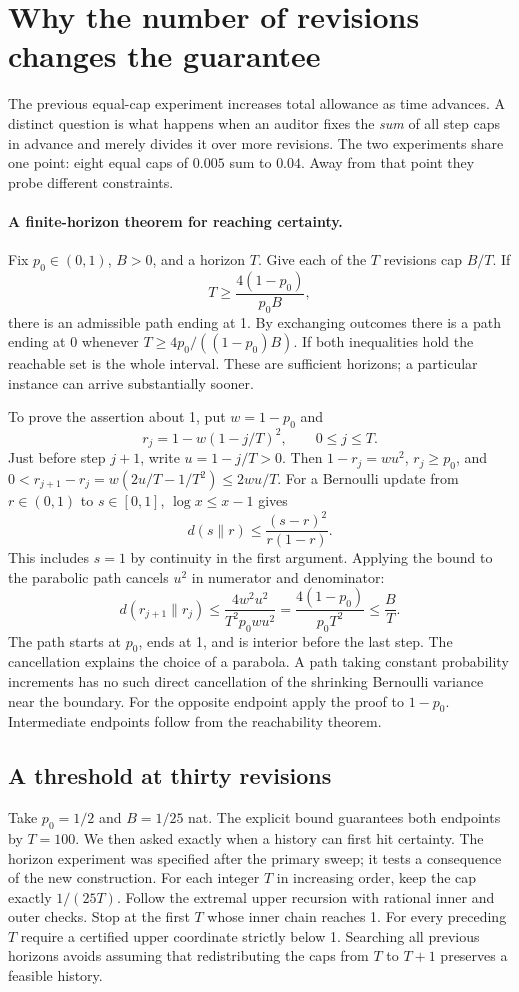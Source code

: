 \documentclass[12pt,letterpaper]{article}
\begin{document}
\section{Why the number of revisions changes the guarantee}
The previous equal-cap experiment increases total allowance as time advances. A distinct question is what happens when an auditor fixes the \emph{sum} of all step caps in advance and merely divides it over more revisions. The two experiments share one point: eight equal caps of \(0.005\) sum to \(0.04\). Away from that point they probe different constraints.

\paragraph{A finite-horizon theorem for reaching certainty.}
Fix \(p_0\in(0,1)\), \(B>0\), and a horizon \(T\). Give each of the \(T\) revisions cap \(B/T\). If
\[
                  T\geq \frac{4(1-p_0)}{p_0 B},
\]
there is an admissible path ending at 1. By exchanging outcomes there is a path ending at 0 whenever \(T\geq4p_0/((1-p_0)B)\). If both inequalities hold the reachable set is the whole interval. These are sufficient horizons; a particular instance can arrive substantially sooner.

To prove the assertion about 1, put \(w=1-p_0\) and
\[
                  r_j=1-w(1-j/T)^2,\qquad 0\leq j\leq T.
\]
Just before step \(j+1\), write \(u=1-j/T>0\). Then \(1-r_j=wu^2\), \(r_j\ge p_0\), and \(0<r_{j+1}-r_j=w(2u/T-1/T^2)\le 2wu/T\). For a Bernoulli update from \(r\in(0,1)\) to \(s\in[0,1]\), \(\log x\le x-1\) gives
\[
       d(s\|r)\le \frac{(s-r)^2}{r(1-r)}.
\]
This includes \(s=1\) by continuity in the first argument. Applying the bound to the parabolic path cancels \(u^2\) in numerator and denominator:
\[
       d(r_{j+1}\|r_j)
       \le \frac{4w^2u^2}{T^2p_0wu^2}
       =\frac{4(1-p_0)}{p_0T^2}\le\frac{B}{T}.
\]
The path starts at \(p_0\), ends at 1, and is interior before the last step. The cancellation explains the choice of a parabola. A path taking constant probability increments has no such direct cancellation of the shrinking Bernoulli variance near the boundary. For the opposite endpoint apply the proof to \(1-p_0\). Intermediate endpoints follow from the reachability theorem.

\subsection{A threshold at thirty revisions}
Take \(p_0=1/2\) and \(B=1/25\) nat. The explicit bound guarantees both endpoints by \(T=100\). We then asked exactly when a history can first hit certainty. The horizon experiment was specified after the primary sweep; it tests a consequence of the new construction. For each integer \(T\) in increasing order, keep the cap exactly \(1/(25T)\). Follow the extremal upper recursion with rational inner and outer checks. Stop at the first \(T\) whose inner chain reaches 1. For every preceding \(T\) require a certified upper coordinate strictly below 1. Searching all previous horizons avoids assuming that redistributing the caps from \(T\) to \(T+1\) preserves a feasible history.
\end{document}
